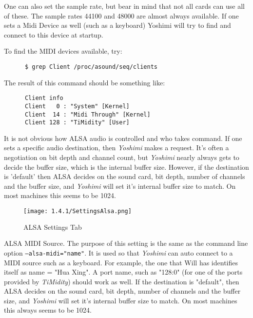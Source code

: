   One can also set the sample rate, but bear in mind that not all cards can use
   all of these.  The sample rates 44100 and 48000 are almost always available.
   If one sets a Midi Device as well (such as a keyboard) Yoshimi will try to
   find and connect to this device at startup.

   To find the MIDI devices available, try:

   \begin{verbatim}
      $ grep Client /proc/asound/seq/clients
   \end{verbatim}

   The result of this command should be something like:

   \begin{verbatim}
      Client info
      Client   0 : "System" [Kernel]
      Client  14 : "Midi Through" [Kernel]
      Client 128 : "TiMidity" [User]
   \end{verbatim}

   It is not obvious how ALSA audio is controlled and who takes command.  If
   one sets a specific audio destination, then \textsl{Yoshimi} makes a
   request.  It's often a negotiation on bit depth and channel count, but
   \textsl{Yoshimi} nearly always gets to decide the buffer size, which is the
   internal buffer size.  However, if the destination is 'default' then ALSA
   decides on the sound card, bit depth, number of channels and the buffer
   size, and \textsl{Yoshimi} will set it's internal buffer size to match.  On
   most machines this seems to be 1024.

\begin{figure}[H]
   \centering 
   \texttt{[image: 1.4.1/SettingsAlsa.png]}
   \caption[ALSA Settings]{ALSA Settings Tab}
   \label{fig:yoshimi_settings_alsa_tab}
\end{figure}

   \setcounter{ItemCounter}{0}      %

   ALSA MIDI Source.
   The purpose of this setting is the same as the command line option
   \texttt{--alsa-midi="name"}.
   It is used so that \textsl{Yoshimi} can auto connect to a MIDI source
   such as a keyboard.  For example, the one that Will has identifies itself
   as name = "Hua Xing".
   A port name, such as "128:0" (for one of the ports provided by
   \textsl{TiMidity}) should work as well.
   If the destination is "default",
   then ALSA decides on the sound card, bit depth, number of channels and the
   buffer size, and \textsl{Yoshimi} will set it's internal buffer size to
   match.  On most machines this always seems to be 1024.

